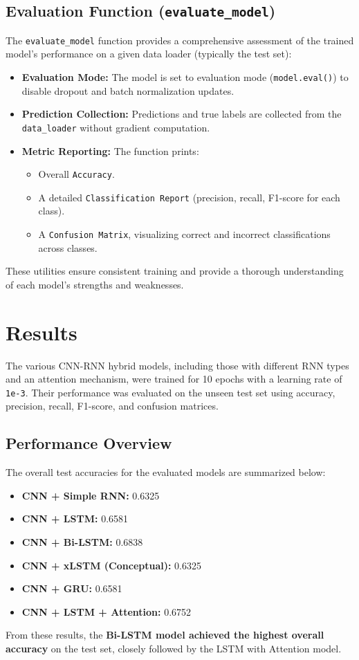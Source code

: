 \documentclass[a4paper]{article}
\begin{document}
\begin{multicols}{2}
\subsection{Evaluation Function (\texttt{evaluate\_model})}
The \texttt{evaluate\_model} function provides a comprehensive assessment of the trained model's performance on a given data loader (typically the test set):
\begin{itemize}
    \item \textbf{Evaluation Mode:} The model is set to evaluation mode (\texttt{model.eval()}) to disable dropout and batch normalization updates.
    \item \textbf{Prediction Collection:} Predictions and true labels are collected from the \texttt{data\_loader} without gradient computation.
    \item \textbf{Metric Reporting:} The function prints:
        \begin{itemize}
            \item Overall \texttt{Accuracy}.
            \item A detailed \texttt{Classification Report} (precision, recall, F1-score for each class).
            \item A \texttt{Confusion Matrix}, visualizing correct and incorrect classifications across classes.
        \end{itemize}
\end{itemize}

These utilities ensure consistent training and provide a thorough understanding of each model's strengths and weaknesses.

\section{Results}
The various CNN-RNN hybrid models, including those with different RNN types and an attention mechanism, were trained for 10 epochs with a learning rate of \texttt{1e-3}. Their performance was evaluated on the unseen test set using accuracy, precision, recall, F1-score, and confusion matrices.

\subsection{Performance Overview}
The overall test accuracies for the evaluated models are summarized below:
\begin{itemize}
    \item \textbf{CNN + Simple RNN:} 0.6325
    \item \textbf{CNN + LSTM:} 0.6581
    \item \textbf{CNN + Bi-LSTM:} 0.6838
    \item \textbf{CNN + xLSTM (Conceptual):} 0.6325
    \item \textbf{CNN + GRU:} 0.6581
    \item \textbf{CNN + LSTM + Attention:} 0.6752
\end{itemize}
From these results, the \textbf{Bi-LSTM model achieved the highest overall accuracy} on the test set, closely followed by the LSTM with Attention model.


\end{multicols}
\end{document}
